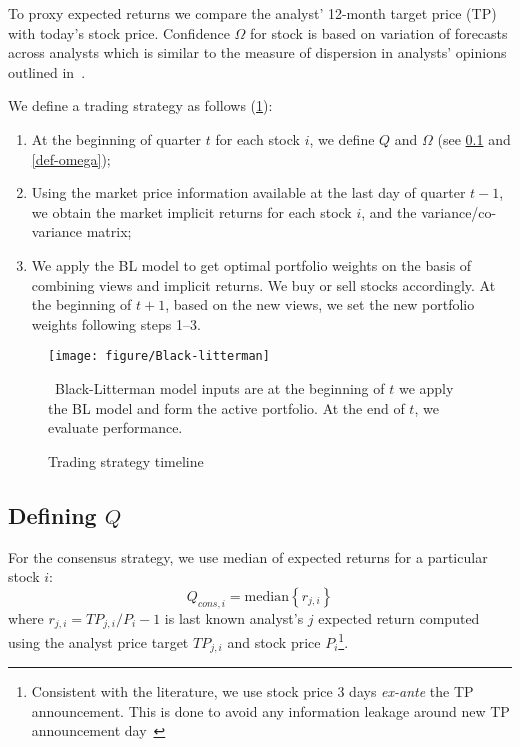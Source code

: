 \documentclass[a4paper,12pt,openright,notitlepage]{report}\usepackage[]{graphicx}\usepackage[]{color}
\begin{document}
To proxy expected returns we compare the analyst' 12-month target price (TP) with today's stock price. Confidence $\Omega$ for stock is based on variation  of forecasts across analysts which is similar to the measure of dispersion in analysts' opinions outlined in~\cite{diether2002}.


We define a trading strategy as follows (\ref{fig:bl}):
\begin{enumerate}
\item  At the beginning of quarter $t$ for each stock $i$,   we define $Q$ and $\Omega$ (see \ref{def-q} and \ref{def-omega});

\item Using the market price information available at the last day of quarter $t-1$, we obtain the market implicit returns for each stock $i$,  and the variance/co-variance matrix;

\item We apply the BL model to get  optimal portfolio weights on the basis of combining views and implicit returns. We  buy or sell stocks accordingly. At the beginning of $t+1$, based on the new views, we set the new portfolio weights following  steps 1--3.
\end{enumerate}


\begin{figure}
\begin{center}
\texttt{[image: figure/Black-litterman]}
\end{center}
\caption{Trading strategy timeline}
\label{fig:bl}
\ Black-Litterman model inputs are at the beginning of $t$ we apply the BL model and form the active portfolio. At the end of $t$, we evaluate performance.
\end{figure}


\subsection{Defining $Q$}
\label{def-q}

For the consensus strategy, we use median of expected returns for a particular stock $i$:
\begin{equation}
\label{consq}
Q_{cons,i}= \mathrm{median} \left\{r_{j,i}\right\}
\end{equation}
where $r_{j,i}=TP_{j,i}/P_{i}-1$  is last known analyst's $j$ expected return computed using the analyst price target $TP_{j,i}$ and stock price $P_{i}$\footnote{Consistent with the literature, we use stock price 3 days \emph{ex-ante} the TP announcement. This is done to avoid any information leakage around new TP announcement day~\citep{bonini2010}}.
\end{document}
